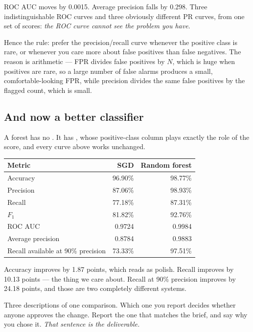\documentclass[11pt,a4paper]{article}
\begin{document}
ROC AUC moves by 0.0015. Average precision falls by 0.298. Three
indistinguishable ROC curves and three obviously different PR curves, from one
set of scores: \emph{the ROC curve cannot see the problem you have}.

Hence the rule: prefer the precision/recall curve whenever the positive class
is rare, or whenever you care more about false positives than false negatives.
The reason is arithmetic --- FPR divides false positives by $N$, which is huge
when positives are rare, so a large number of false alarms produces a small,
comfortable-looking FPR, while precision divides the same false positives by
the flagged count, which is small.

\subsection{And now a better classifier}

A forest has no . It has , whose
positive-class column plays exactly the role of the score, and every curve
above works unchanged.

\begin{center}
\small
\begin{tabular}{lrr}
\toprule
\textbf{Metric} & \textbf{SGD} & \textbf{Random forest} \\
\midrule
Accuracy   & 96.90\% & 98.77\% \\
Precision  & 87.06\% & 98.93\% \\
Recall     & 77.18\% & 87.31\% \\
$F_1$      & 81.82\% & 92.76\% \\
ROC AUC    & 0.9724  & 0.9984 \\
Average precision & 0.8784 & 0.9883 \\
Recall available at 90\% precision & 73.33\% & 97.51\% \\
\bottomrule
\end{tabular}
\end{center}

\begin{keybox}[title={Which metric noticed?}]
Accuracy improves by 1.87 points, which reads as polish. Recall improves by
10.13 points --- the thing we care about. Recall at 90\% precision improves by
24.18 points, and those are two completely different systems.

Three descriptions of one comparison. Which one you report decides whether
anyone approves the change. Report the one that matches the brief, and say why
you chose it. \emph{That sentence is the deliverable.}
\end{keybox}
\end{document}
